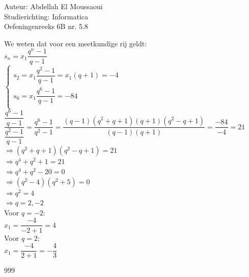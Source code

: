 \documentclass[a4paper]{article}
\begin{document}
  
\noindent \large Auteur: Abdellah El Moussaoui \\
\noindent \large Studierichting: Informatica\\
\noindent \large Oefeningenreeks 6B nr. 5.8\\

\medskip

\normalsize

We weten dat voor een meetkundige rij geldt:\\

$s_n=x_1\dfrac{q^n-1}{q-1}$\\

$\left\{
\begin{array}{l}
s_2=x_1\dfrac{q^2-1}{q-1} = x_1\left(q+1\right)=-4\\
s_6=x_1\dfrac{q^6-1}{q-1} = -84\\
\end{array}
\right.$\\

$\dfrac{\dfrac{q^6-1}{q-1}}{\dfrac{q^2-1}{q-1}} = \dfrac{q^6-1}{q^2-1} = \dfrac{\left(q-1\right)\left(q^2+q+1\right)\left(q+1\right)\left(q^2-q+1\right)}{(q-1)(q+1)} = \dfrac{-84}{-4} =21$\\

$\Rightarrow \left(q^2+q+1\right)\left(q^2-q+1\right)=21$\\

$\Rightarrow q^4+q^2+1=21$\\

$\Rightarrow q^4+q^2-20=0$\\

$\Rightarrow \left(q^2-4\right)\left(q^2+5\right)=0$\\

$\Rightarrow q^2=4$\\

$\Rightarrow q=2,-2$\\

Voor $q = -2$:\\

$x_1=\dfrac{-4}{-2+1}=4$\\

Voor $q = 2$:\\

$x_1=\dfrac{-4}{2+1}=-\dfrac{4}{3}$\\



\begin{thebibliography}{999}
\end{thebibliography}
\end{document}
